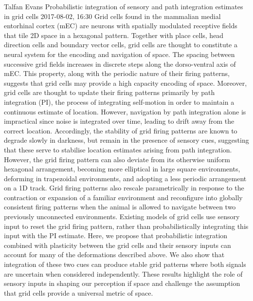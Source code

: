 \documentclass[10pt,fleqn,openany]{book} %
\begin{document}
\begin{enumerate}
		
		\paperabstract
		{Talfan Evans}
		{Probabilistic integration of sensory and path integration estimates in grid cells}
		{2017-08-02, 16:30}
		{Grid cells found in the mammalian medial entorhinal cortex (mEC) are neurons with spatially modulated receptive fields that tile 2D space in a hexagonal pattern. Together with place cells, head direction cells and boundary vector cells, grid cells are thought to constitute a neural system for the encoding and navigation of space. The spacing between successive grid fields increases in discrete steps along the dorso-ventral axis of mEC. This property, along with the periodic nature of their firing patterns, suggests that grid cells may provide a high capacity encoding of space. Moreover, grid cells are thought to update their firing patterns primarily by path integration (PI), the process of integrating self-motion in order to maintain a continuous estimate of location. However, navigation by path integration alone is impractical since noise is integrated over time, leading to drift away from the correct location. Accordingly, the stability of grid firing patterns are known to degrade slowly in darkness, but remain in the presence of sensory cues, suggesting that these serve to stabilise location estimates arising from path integration. However, the grid firing pattern can also deviate from its otherwise uniform hexagonal arrangement, becoming more elliptical in large square environments, deforming in trapezoidal environments, and adopting a less periodic arrangement on a 1D track. Grid firing patterns also rescale parametrically in response to the contraction or expansion of a familiar environment and reconfigure into globally consistent firing patterns when the animal is allowed to navigate between two previously unconnected environments.  Existing models of grid cells use sensory input to reset the grid firing pattern, rather than probabilistically integrating this input with the PI estimate. Here, we propose that probabilistic integration combined with plasticity between the grid cells and their sensory inputs can account for many of the deformations described above. We also show that integration of these two cues can produce stable grid patterns where both signals are uncertain when considered independently. These results highlight the role of sensory inputs in shaping our perception if space and challenge the assumption that grid cells provide a universal metric of space.}
		

\end{enumerate}
\end{document}
